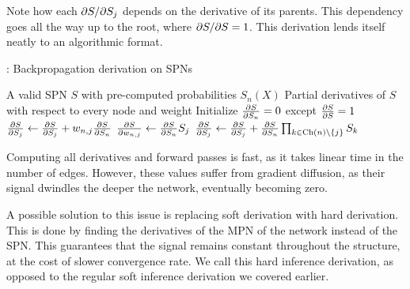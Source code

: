 Note how each $\partial S/\partial S_j$ depends on the derivative of its parents. This dependency goes all
the way up to the root, where $\partial S/\partial S=1$. This derivation lends itself neatly to an
algorithmic format.

\begin{algorithm}[H]
  \caption{: Backpropagation derivation on SPNs}
  \begin{algorithmic}[1]
    \Require A valid SPN $S$ with pre-computed probabilities $S_n(X)$
    \Ensure Partial derivatives of $S$ with respect to every node and weight
    \State Initialize $\frac{\partial S}{\partial S_n}=0$ except $\frac{\partial S}{\partial S}=1$
          \State $\frac{\partial S}{\partial S_j}\gets\frac{\partial S}{\partial S_j}+w_{n,j}\frac{\partial S}{\partial S_n}$
          \State $\frac{\partial S}{\partial w_{n,j}}\gets\frac{\partial S}{\partial S_n}S_j$
        \EndFor%
      \Else%
          \State $\frac{\partial S}{\partial S_j}\gets\frac{\partial S}{\partial S_j}+\frac{\partial S}{\partial S_n}\prod_{k\in\operatorname*{\text{Ch}}(n)\setminus
            \{j\}}S_k$
        \EndFor%
      \EndIf
    \EndFor%
  \end{algorithmic}
\end{algorithm}

Computing all derivatives and forward passes is fast, as it takes linear time in the number of
edges. However, these values suffer from gradient diffusion, as their signal dwindles the deeper
the network, eventually becoming zero.

A possible solution to this issue is replacing soft derivation with hard derivation. This is done
by finding the derivatives of the MPN of the network instead of the SPN\@. This guarantees that the
signal remains constant throughout the structure, at the cost of slower convergence rate. We call
this hard inference derivation, as opposed to the regular soft inference derivation we covered
earlier.

